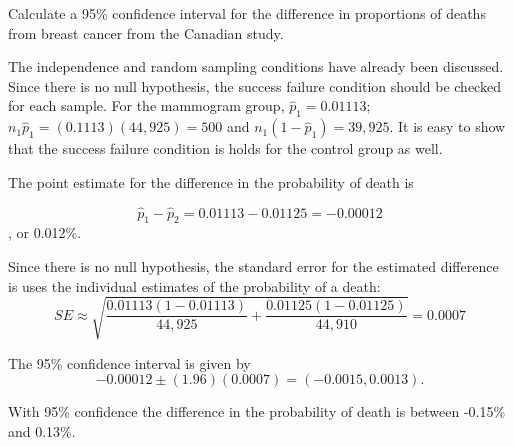 \begin{example}{Calculate a 95\% confidence interval for the difference in proportions of deaths from breast cancer from the Canadian study.}

\label{mammogramExConfInt}

The independence and random sampling conditions have already been discussed.  Since there is no null hypothesis, the success failure condition should be checked for each sample.  For the mammogram group, $\hat{p}_1 = 0.01113$; $n_1 \hat{p}_1 = (0.1113)(44,925) = 500$ and $n_1 (1 - \hat{p}_1) = 39,925.$ It is easy to show that the success failure condition is holds for the control group as well.

The point estimate for the difference in the probability of death is

$$\hat{p}_{1} - \hat{p}_{2} = 0.01113 - 0.01125 = -0.00012$$, or 0.012\%.

Since there is no null hypothesis, the standard error for the estimated difference is uses the individual estimates of the probability of a death:
$$SE \approx \sqrt{\frac{0.01113(1-0.01113)}{44,925} + \frac{0.01125(1-0.01125)}{44,910}} = 0.0007 $$

The 95\% confidence interval is given by 
$$ -0.00012 \pm (1.96) (0.0007) = (-0.0015, 0.0013).$$

With 95\% confidence the difference in the probability of death is between -0.15\% and 0.13\%. 

\end{example}






